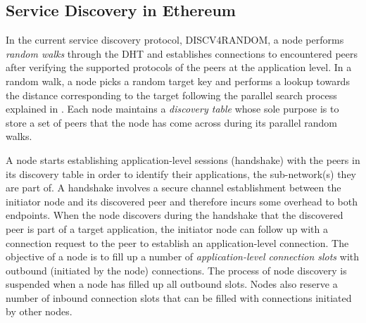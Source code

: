 

\subsection{Service Discovery in Ethereum}
\label{sec:discv4}

In the current service discovery protocol, DISCV4RANDOM, a node performs \textit{random walks} through the DHT and establishes connections to encountered peers after verifying the supported protocols of the peers at the application level. In a random walk, a node picks a random target key and performs a lookup towards the distance corresponding to the target following the parallel search process explained in . Each node maintains a \textit{discovery table} whose sole purpose is to store a set of peers that the node has come across during its parallel random walks. %


A node starts establishing application-level sessions (\ie handshake) with the peers in its discovery table in order to identify their applications, \ie the sub-network(s) they are part of. A handshake involves a secure channel establishment between the initiator node and its discovered peer and therefore incurs some overhead to both endpoints. When the node discovers during the handshake that the discovered peer is part of a target application, the initiator node can follow up with a connection request to the peer to establish an application-level connection. The objective of a node is to fill up a number of \textit{application-level connection slots} with outbound (\ie initiated by the node) connections. The process of node discovery is suspended when a node has filled up all outbound slots. Nodes also reserve a number of inbound connection slots that can be filled with connections initiated by other nodes. 


